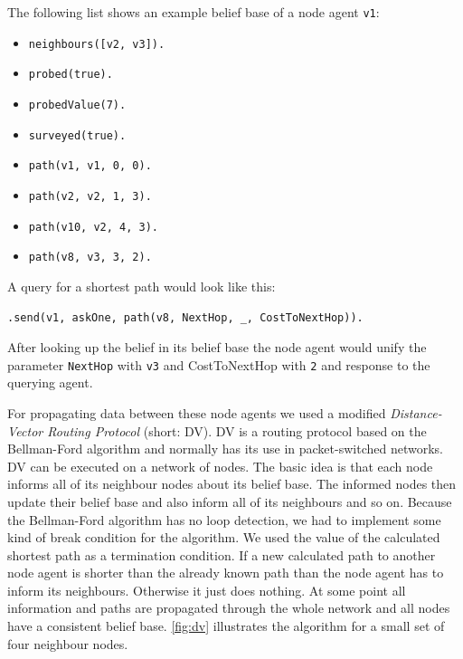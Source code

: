 \begin{samepage}
The following list shows an example belief base of a node agent \texttt{v1}:
\begin{itemize}
  \item \texttt{neighbours([v2, v3]).}
  \item \texttt{probed(true).}
  \item \texttt{probedValue(7).}
  \item \texttt{surveyed(true).}
  \item \texttt{path(v1, v1, 0, 0).}
  \item \texttt{path(v2, v2, 1, 3).}
  \item \texttt{path(v10, v2, 4, 3).}
  \item \texttt{path(v8, v3, 3, 2).}
\end{itemize}
\end{samepage}

A query for a shortest path would look like this:
\begin{lstlisting}[caption={Query for shortest path from \texttt{v1} to \texttt{v8}}, label={lst:dv_shortestPath_query}]
  .send(v1, askOne, path(v8, NextHop, _, CostToNextHop)).
\end{lstlisting}
After looking up the belief in its belief base the node agent would unify the parameter \texttt{NextHop} with \texttt{v3} and CostToNextHop with \texttt{2} and response to the querying agent.

For propagating data between these node agents we used a modified \emph{Distance-Vector Routing Protocol} (short: DV).
DV is a routing protocol based on the Bellman-Ford algorithm and normally has its use in packet-switched networks.
DV can be executed on a network of nodes.
The basic idea is that each node informs all of its neighbour nodes about its belief base.
The informed nodes then update their belief base and also inform all of its neighbours and so on.
Because the Bellman-Ford algorithm has no loop detection, we had to implement some kind of break condition for the algorithm.
We used the value of the calculated shortest path as a termination condition.
If a new calculated path to another node agent is shorter than the already known path than the node agent has to inform its neighbours.
Otherwise it just does nothing.
At some point all information and paths are propagated through the whole network and all nodes have a consistent belief base.
\autoref{fig:dv} illustrates the algorithm for a small set of four neighbour nodes.

